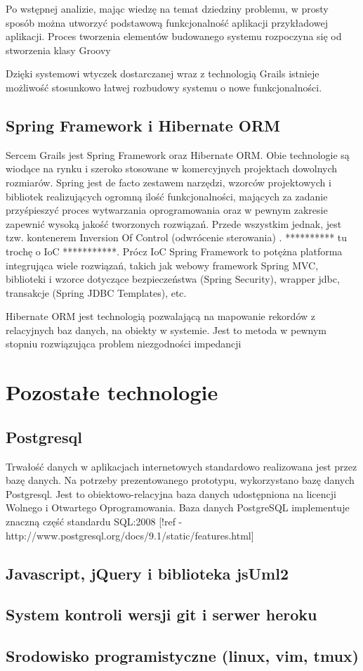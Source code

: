     Po wstępnej analizie, mając wiedzę na temat dziedziny problemu, w prosty sposób można utworzyć podstawową funkcjonalność aplikacji przykładowej aplikacji. Proces tworzenia elementów budowanego systemu rozpoczyna się od stworzenia klasy Groovy

    Dzięki systemowi wtyczek dostarczanej wraz z technologią Grails istnieje możliwość stosunkowo łatwej rozbudowy systemu o nowe funkcjonalności.


    \subsection{Spring Framework i Hibernate ORM}

      Sercem Grails jest Spring Framework oraz Hibernate ORM. Obie technologie są wiodące na rynku i szeroko stosowane w komercyjnych projektach dowolnych rozmiarów. Spring jest de facto zestawem narzędzi, wzorców projektowych i bibliotek realizujących ogromną ilość funkcjonalności, mających za zadanie przyśpieszyć proces wytwarzania oprogramowania oraz w pewnym zakresie zapewnić wysoką jakość tworzonych rozwiązań. Przede wszystkim jednak, jest tzw. kontenerem Inversion Of Control (odwrócenie sterowania) \cite{MFow01}. ********** tu trochę o IoC ***********. Prócz IoC Spring Framework to potężna platforma integrująca wiele rozwiązań, takich jak webowy framework Spring MVC, biblioteki i wzorce dotyczące bezpieczeństwa (Spring Security), wrapper jdbc, transakcje (Spring JDBC Templates), etc.

      Hibernate ORM jest technologią pozwalającą na mapowanie rekordów z relacyjnych baz danych, na obiekty w systemie. Jest to metoda w pewnym stopniu rozwiązująca problem niezgodności impedancji \cite{KSub01}

  \section{Pozostałe technologie}
    \subsection{Postgresql}
      Trwałość danych w aplikacjach internetowych standardowo realizowana jest przez bazę danych. Na potrzeby prezentowanego prototypu, wykorzystano bazę danych Postgresql. Jest to obiektowo-relacyjna baza danych udostępniona na licencji Wolnego i Otwartego Oprogramowania. Baza danych PostgreSQL implementuje znaczną część standardu SQL:2008 [!ref - http://www.postgresql.org/docs/9.1/static/features.html]

    \subsection{Javascript, jQuery i biblioteka jsUml2}
      
       
    \subsection{System kontroli wersji git i serwer heroku}
    \subsection{Srodowisko programistyczne (linux, vim, tmux)}

